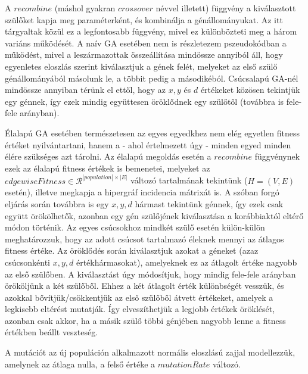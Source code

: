 A $recombine$ (máshol gyakran $crossover$ névvel illetett) függvény a kiválasztott szülőket kapja meg paraméterként, és kombinálja a génállományukat. Az itt tárgyaltak közül ez a legfontosabb függvény, mivel ez különbözteti meg a három variáns működését. A naív GA esetében nem is részletezem pszeudokódban a működést, mivel a leszármazottak összeállítása mindössze annyiból áll, hogy egyenletes eloszlás szerint kiválasztjuk a gének felét, melyeket az első szülő génállományából másolunk le, a többit pedig a másodikéból. Csúcsalapú GA-nél mindössze annyiban térünk el ettől, hogy az $x,y$ és $d$ értékeket közösen tekintjük egy génnek, így ezek mindig együttesen öröklődnek egy szülőtől (továbbra is fele-fele arányban).


Élalapú GA esetében természetesen az egyes egyedkhez nem elég egyetlen fitness értéket nyilvántartani, hanem a - ahol értelmezett úgy - minden egyed minden élére szükséges azt tárolni. Az élalapú megoldás esetén a $recombine$ függvénynek ezek az élalapú fitness értékek is bemenetei, melyeket az $edgewiseFitness \in \mathcal{R}^{|population| \times |E|}$ változó tartalmának tekintünk ($H=(V,E)$ esetén), illetve megkapja a hipergráf incidencia mátrixát is. A szóban forgó eljárás során továbbra is egy $x,y,d$ hármast tekintünk génnek, így ezek csak együtt örökölhetők, azonban egy gén szülőjének kiválasztása a korábbiaktól eltérő módon történik. Az egyes csúcsokhoz mindkét szülő esetén külön-külön meghatározzuk, hogy az adott csúcsot tartalmazó éleknek mennyi az átlagos fitness értéke. Az öröklődés során kiválasztjuk azokat a géneket (azaz csúcsonkénti $x,y,d$ értékhármasokat), amelyeknek ez az átlagolt értéke nagyobb az első szülőben. A kiválasztást úgy módosítjuk, hogy mindig fele-fele arányban örököljünk a két szülőből. Ehhez a két átlagolt érték különbségét vesszük, és azokkal bővítjük/csökkentjük az első szülőből átvett értékeket, amelyek a legkisebb eltérést mutatják. Így elveszíthetjük a legjobb értékek öröklését, azonban csak akkor, ha a másik szülő többi génjében nagyobb lenne a fitness értékben beállt veszteség.


A mutációt az új populáción alkalmazott normális eloszlású zajjal modellezzük, amelynek az átlaga nulla, a felső értéke a $mutationRate$ változó.



